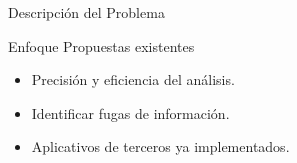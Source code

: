\begin{frame}{Descripción del Problema}
\begin{block}{Enfoque Propuestas existentes}
\begin{itemize}
  \item Precisión y eficiencia del análisis.
  \item Identificar fugas de información. 
  \item Aplicativos de terceros ya implementados.
\end{itemize}
\end{block}
\end{frame}
% 
% 
% 	
% 
